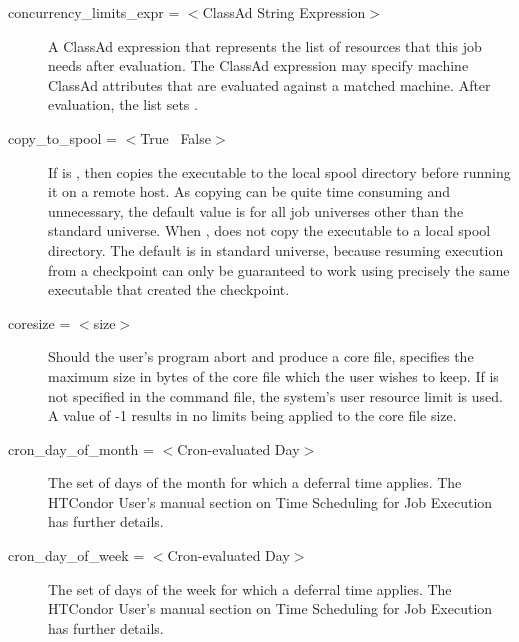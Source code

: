 \begin{description}
\label{condor-submit-concurrency-limits}
\item[concurrency\_limits\_expr = $<$ClassAd String Expression$>$] 
A ClassAd expression that represents the list of resources that this job needs
after evaluation.
The ClassAd expression may specify machine ClassAd attributes that
are evaluated against a matched machine.
After evaluation, the list sets .


\label{condor-submit-copy-to-spool}
\item[copy\_to\_spool = $<$True \Bar\ False$>$]
If  is ,
then  copies the executable to the local spool 
directory before running it on a remote host. 
As copying can be quite time consuming and unnecessary,
the default value is  for all job universes
other than the standard universe. 
When ,  does not copy the executable
to a local spool directory.
The default is  in standard universe, because
resuming execution from a checkpoint can only be guaranteed to work using
precisely the same executable that created the checkpoint.


\label{condor-submit-coresize}
\item[coresize = $<$size$>$] Should the user's program abort and produce
a core file,  specifies the maximum size in bytes of the
core file which the user wishes to keep. If  is not
specified in the command file, the system's user resource limit
 is used.
A value of -1 results in no limits being applied to the core file size.

\label{condor-submit-cron-day-of-month}
\item[cron\_day\_of\_month = $<$Cron-evaluated Day$>$]
The set of days of the month for which a deferral time applies.
The HTCondor User's manual section on Time Scheduling for Job Execution
has further details.

\label{condor-submit-cron-day-of-week}
\item[cron\_day\_of\_week = $<$Cron-evaluated Day$>$]
The set of days of the week for which a deferral time applies.
The HTCondor User's manual section on Time Scheduling for Job Execution
has further details.


\end{description}
